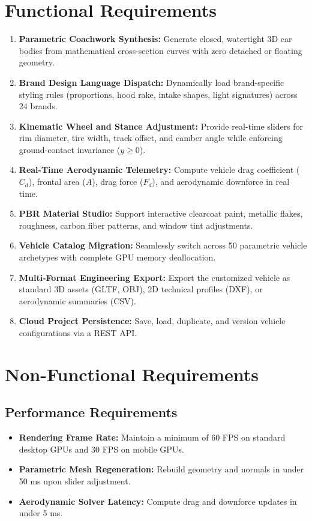 \documentclass[12pt,a4paper]{report}
\begin{document}
\section{Functional Requirements}
\begin{enumerate}
    \item \textbf{Parametric Coachwork Synthesis:} Generate closed, watertight 3D car bodies from mathematical cross-section curves with zero detached or floating geometry.
    \item \textbf{Brand Design Language Dispatch:} Dynamically load brand-specific styling rules (proportions, hood rake, intake shapes, light signatures) across 24 brands.
    \item \textbf{Kinematic Wheel and Stance Adjustment:} Provide real-time sliders for rim diameter, tire width, track offset, and camber angle while enforcing ground-contact invariance ($y \ge 0$).
    \item \textbf{Real-Time Aerodynamic Telemetry:} Compute vehicle drag coefficient ($C_d$), frontal area ($A$), drag force ($F_d$), and aerodynamic downforce in real time.
    \item \textbf{PBR Material Studio:} Support interactive clearcoat paint, metallic flakes, roughness, carbon fiber patterns, and window tint adjustments.
    \item \textbf{Vehicle Catalog Migration:} Seamlessly switch across 50 parametric vehicle archetypes with complete GPU memory deallocation.
    \item \textbf{Multi-Format Engineering Export:} Export the customized vehicle as standard 3D assets (GLTF, OBJ), 2D technical profiles (DXF), or aerodynamic summaries (CSV).
    \item \textbf{Cloud Project Persistence:} Save, load, duplicate, and version vehicle configurations via a REST API.
\end{enumerate}

\section{Non-Functional Requirements}

\subsection{Performance Requirements}
\begin{itemize}
    \item \textbf{Rendering Frame Rate:} Maintain a minimum of 60 FPS on standard desktop GPUs and 30 FPS on mobile GPUs.
    \item \textbf{Parametric Mesh Regeneration:} Rebuild geometry and normals in under 50 ms upon slider adjustment.
    \item \textbf{Aerodynamic Solver Latency:} Compute drag and downforce updates in under 5 ms.
\end{itemize}
\end{document}
